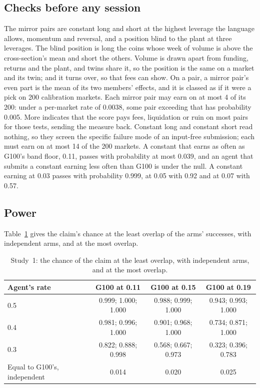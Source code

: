 \documentclass[11pt]{article}
\begin{document}
\subsection{Checks before any session}

The mirror pairs are constant long and short at the highest leverage the language allows, momentum and reversal, and a position blind to the plant at three leverages. The blind position is long the coins whose week of volume is above the cross-section's mean and short the others. Volume is drawn apart from funding, returns and the plant, and twins share it, so the position is the same on a market and its twin; and it turns over, so that fees can show. On a pair, a mirror pair's even part is the mean of its two members' effects, and it is classed as if it were a pick on 200 calibration markets. Each mirror pair may earn on at most 4 of its 200: under a per-market rate of 0.0038, some pair exceeding that has probability 0.005. More indicates that the score pays fees, liquidation or ruin on most pairs for those tests, sending the measure back. Constant long and constant short read nothing, so they screen the specific failure mode of an input-free submission; each must earn on at most 14 of the 200 markets. A constant that earns as often as G100's band floor, 0.11, passes with probability at most 0.039, and an agent that submits a constant earning less often than G100 is under the null. A constant earning at 0.03 passes with probability 0.999, at 0.05 with 0.92 and at 0.07 with 0.57.

\subsection{Power}

Table~\ref{tab:study1} gives the claim's chance at the least overlap of the arms' successes, with independent arms, and at the most overlap.

\begin{table}[ht]
\centering
\small
\begin{tabular}{@{}lccc@{}}
\toprule
Agent's rate & G100 at 0.11 & G100 at 0.15 & G100 at 0.19 \\
\midrule
0.5 & 0.999; 1.000; 1.000 & 0.988; 0.999; 1.000 & 0.943; 0.993; 1.000 \\
0.4 & 0.981; 0.996; 1.000 & 0.901; 0.968; 1.000 & 0.734; 0.871; 1.000 \\
0.3 & 0.822; 0.888; 0.998 & 0.568; 0.667; 0.973 & 0.323; 0.396; 0.783 \\
Equal to G100's, independent & 0.014 & 0.020 & 0.025 \\
\bottomrule
\end{tabular}
\caption{Study~1: the chance of the claim at the least overlap, with independent arms, and at the most overlap.}
\label{tab:study1}
\end{table}
\end{document}
